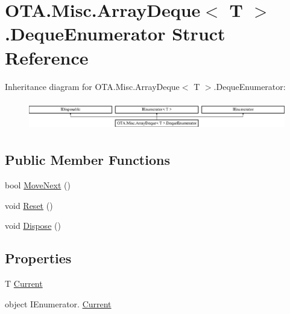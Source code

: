 \hypertarget{struct_o_t_a_1_1_misc_1_1_array_deque_1_1_deque_enumerator}{}\section{O\+T\+A.\+Misc.\+Array\+Deque$<$ T $>$.Deque\+Enumerator Struct Reference}
\label{struct_o_t_a_1_1_misc_1_1_array_deque_1_1_deque_enumerator}
Inheritance diagram for O\+T\+A.\+Misc.\+Array\+Deque$<$ T $>$.Deque\+Enumerator\+:\begin{figure}[H]
\begin{center}
\leavevmode
\includegraphics[height=1.305361cm]{struct_o_t_a_1_1_misc_1_1_array_deque_1_1_deque_enumerator}
\end{center}
\end{figure}
\subsection*{Public Member Functions}
\begin{DoxyCompactItemize}
\item 
bool \hyperlink{struct_o_t_a_1_1_misc_1_1_array_deque_1_1_deque_enumerator_a2f9bfeda1b215c3c252d7860f5af62b4}{Move\+Next} ()
\item 
void \hyperlink{struct_o_t_a_1_1_misc_1_1_array_deque_1_1_deque_enumerator_a301db65a392d2e4e598fc40c242ed104}{Reset} ()
\item 
void \hyperlink{struct_o_t_a_1_1_misc_1_1_array_deque_1_1_deque_enumerator_a92ceec8c67706798afd5825b7b70680f}{Dispose} ()
\end{DoxyCompactItemize}
\subsection*{Properties}
\begin{DoxyCompactItemize}
\item 
T \hyperlink{struct_o_t_a_1_1_misc_1_1_array_deque_1_1_deque_enumerator_ae49e9bafbdf32aeee0662944ebe4ad8b}{Current}
\item 
object I\+Enumerator. \hyperlink{struct_o_t_a_1_1_misc_1_1_array_deque_1_1_deque_enumerator_a41254c45c70395bb1a2795835260d602}{Current}
\end{DoxyCompactItemize}


